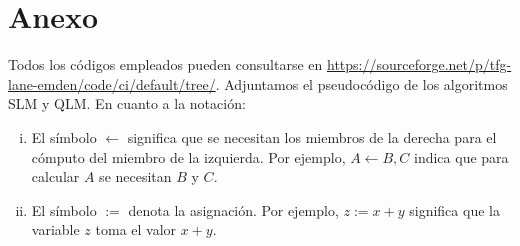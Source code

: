 \documentclass[main.tex]{subfiles}
\begin{document}
	\chapter*{\vspace{-1in}Anexo}
	

Todos los códigos empleados pueden consultarse en \href{https://sourceforge.net/p/tfg-lane-emden/code/ci/default/tree/}{https://sourceforge.net/p/tfg-lane-emden/code/ci/default/tree/}. Adjuntamos el pseudocódigo de los algoritmos SLM y QLM.
En cuanto a la notación:
\begin{enumerate}[(i)]
	\item El símbolo $\leftarrow$ significa que se necesitan los miembros de la derecha para el cómputo del miembro de la izquierda. Por ejemplo, $A\leftarrow B,C$ indica que para calcular $A$ se necesitan $B$ y $C$. 
	\item El símbolo $:=$ denota la asignación. Por ejemplo, $z:=x+y$ significa que la variable $z$ toma el valor $x+y$.
\end{enumerate}
\end{document}
